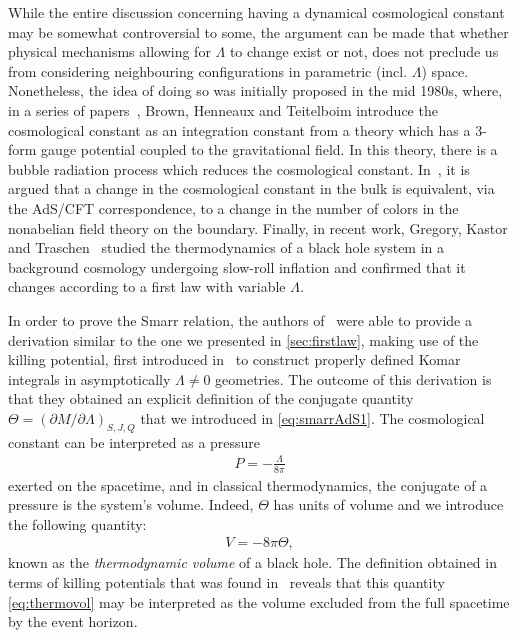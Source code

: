 \documentclass[
twoside,
openright,
frontopenright,
]{dmathesis}
\begin{document}
While the entire discussion concerning having a dynamical cosmological constant
may be somewhat controversial to some, the argument can be made that whether
physical mechanisms allowing for $\Lambda$ to change exist or not, does not
preclude us from considering neighbouring configurations in parametric
(incl. $\Lambda$) space. Nonetheless, the idea of doing so was initially
proposed in the mid 1980s, where, in a series of papers~\cite{Henneaux:1984ji,
  Teitelboim:1985dp, Henneaux:1985tv, Brown:1987dd, Brown:1988kg,
  Henneaux:1989zc}, Brown, Henneaux and Teitelboim introduce the cosmological
constant as an integration constant from a theory which has a 3-form gauge
potential coupled to the gravitational field. In this theory, there is a bubble
radiation process which reduces the cosmological
constant. In~\cite{Kastor:2009wy}, it is argued that a change in the
cosmological constant in the bulk is equivalent, via the AdS/CFT correspondence,
to a change in the number of colors in the nonabelian field theory on the
boundary. Finally, in recent work, Gregory, Kastor and
Traschen~\cite{Gregory:2017sor,Gregory:2018ghc} studied the thermodynamics of a
black hole system in a background cosmology undergoing slow-roll inflation and
confirmed that it changes according to a first law with variable $\Lambda$.

In order to prove the Smarr relation, the authors of~\cite{Kastor:2009wy} were
able to provide a derivation similar to the one we presented in
\cref{sec:firstlaw}, making use of the killing potential, first introduced
in~\cite{Bazanski:1990qd,Kastor:2008xb} to construct properly defined Komar
integrals in asymptotically $\Lambda\neq 0$ geometries. The outcome of this
derivation is that they obtained an explicit definition of the conjugate
quantity $\Theta = (\partial M/\partial \Lambda)_{S,J,Q}$ that we introduced in
\cref{eq:smarrAdS1}. The cosmological constant can be interpreted as a pressure
\begin{align}
  P = -\frac{\Lambda}{8\pi}
\end{align}
exerted on the spacetime, and in classical thermodynamics, the conjugate of a
pressure is the system's volume. Indeed, $\Theta$ has units of volume and we
introduce the following quantity:
\begin{align}
  \label{eq:thermovol}
  V=-8\pi\Theta,
\end{align}
known as the \emph{thermodynamic volume} of a black hole. The definition
obtained in terms of killing potentials that was found in~\cite{Kastor:2009wy}
reveals that this quantity \eqref{eq:thermovol} may be interpreted as the volume
excluded from the full spacetime by the event horizon.
\end{document}
